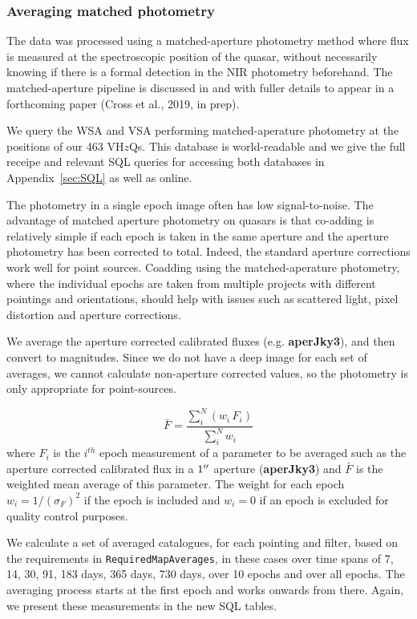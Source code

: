 \documentclass[usenatbib]{mnras}
\begin{document}
  \subsubsection{Averaging matched photometry}
  The data was processed using a matched-aperture photometry method
  where flux is measured at the spectroscopic position of the quasar,
  without necessarily knowing if there is a formal detection in the NIR
  photometry beforehand. The matched-aperture pipeline is discussed in
  \citet{Cross2013} and with fuller details to appear in a forthcoming
  paper (Cross et al., 2019, in prep).
  
  We query the WSA and VSA performing matched-aperature photometry at
  the positions of our 463 VH$z$Qs. This database is world-readable and
  we give the full receipe and relevant SQL queries for accessing both
  databases in Appendix~\ref{sec:SQL} as well as online. 
  
  The photometry in a single epoch image often has low
  signal-to-noise.  The advantage of matched aperture photometry on
  quasars is that co-adding is relatively simple if each epoch is taken
  in the same aperture and the aperture photometry has been corrected to
  total. Indeed, the standard aperture corrections work well for point
  sources. Coadding using the matched-aperature photometry, where the
  individual epochs are taken from multiple projects with different
  pointings and orientations, should help with issues such as scattered
  light, pixel distortion and aperture corrections.
    
  We average the aperture corrected calibrated fluxes (e.g. {\bf
  aperJky3}), and then convert to magnitudes. Since we do not have a
  deep image for each set of averages, we cannot calculate non-aperture
  corrected values, so the photometry is only appropriate for
  point-sources.

  \begin{equation}
    \bar{F} = \frac{\sum_i^N (w_i\,F_i)}{\sum_i^N w_i}  
    \label{eq:avg}
  \end{equation}
  where $F_i$ is the $i^{th}$ epoch measurement of a parameter to be
  averaged such as the aperture corrected calibrated flux in a $1\hbox{$^{\prime\prime}$}$ aperture
  ({\bf aperJky3}) and $\bar{F}$ is the weighted mean average of this parameter.
  The weight for each epoch $w_i=1/(\sigma_{F})^2$ if the epoch is included and 
  $w_i=0$ if an epoch is excluded for quality control purposes. 
   
  We calculate a set of averaged catalogues, for each pointing and filter, based
  on the requirements in \verb+RequiredMapAverages+, in these cases over time
  spans of 7, 14, 30, 91, 183 days, 365 days, 730 days, over 10 epochs and
  over all epochs. The averaging process starts at the first epoch and works onwards 
  from there. Again, we present these measurements in the new SQL tables. 
\end{document}
